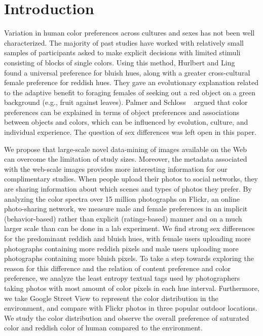 \section{Introduction}
Variation in human color preferences across cultures and sexes has not been well characterized. The majority of past studies have worked with relatively small samples of participants asked to make explicit decisions with limited stimuli consisting of blocks of single colors. 
Using this method, Hurlbert and Ling ~\cite{} found a universal preference for bluish hues, along with a greater cross-cultural female preference for reddish hues.
They gave an evolutionary explanation related to the adaptive benefit to foraging females of seeking out a red object on a green background (e.g., fruit against leaves).  
Palmer and Schloss ~\cite{} argued that color preferences can be explained in terms of object preferences and associations between objects and colors, which can be influenced by evolution, culture, and individual experience.  The question of sex differences was left open in this paper.

We propose that large-scale novel data-mining of images available on the Web can overcome the limitation of study sizes. Moreover, the metadata associated with the web-scale images provides more interesting information for our complimentary studies.
When people upload their photos to social networks, they are sharing information about which scenes and types of photos they prefer.
By analyzing the color spectra over 15 million photographs on Flickr, an online photo-sharing network, we measure male and female preferences in an implicit (behavior-based) rather than explicit (ratings-based) manner and on a much larger scale than can be done in a lab experiment.
We find strong sex differences for the predominant reddish and bluish hues, with female users uploading more photographs containing more reddish pixels and male users uploading more photographs containing more bluish pixels.
To take a step towards exploring the reason for this difference and the relation of content preference and color preference, we analyze the least entropy textual tags used by photographers taking photos with most amount of color pixels in each hue interval. Furthermore, we take Google Street View to represent the color distribution in the environment, and compare with Flickr photos in three popular outdoor locations. We study the color distribution and observe the overall preference of saturated color and reddish color of human compared to the environment.

